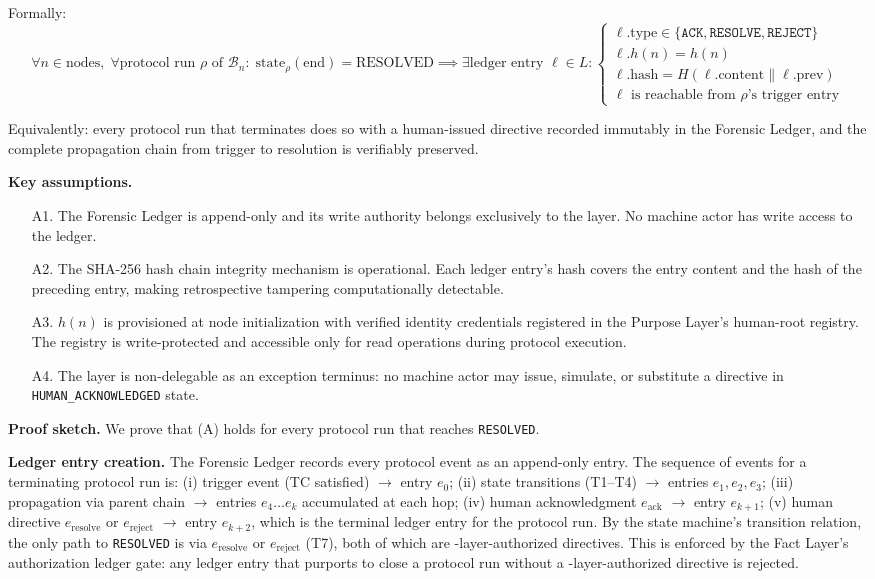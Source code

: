 Formally:
\[
\forall n \in \text{nodes},\; \forall \text{protocol run } \rho \text{ of } \mathcal{B}_n:\;
\text{state}_{\rho}(\text{end}) = \text{RESOLVED}
\implies
\exists \text{ledger entry } \ell \in L:
\begin{cases}
\ell.\text{type} \in \{\texttt{ACK}, \texttt{RESOLVE}, \texttt{REJECT}\} \\
\ell.h(n) = h(n) \\
\ell.\text{hash} = H(\ell.\text{content} \| \ell.\text{prev}) \\
\ell \text{ is reachable from } \rho\text{'s trigger entry}
\end{cases}
\tag{A}
\]

Equivalently: every protocol run that terminates does so with a human-issued directive recorded immutably in the Forensic Ledger, and the complete propagation chain from trigger to resolution is verifiably preserved.

\medskip\noindent\textbf{Key assumptions.}
\begin{itemize}\itemsep=0pt
\item[A1.] The Forensic Ledger is append-only and its write authority belongs exclusively to the \fact{} layer. No machine actor has write access to the ledger.
\item[A2.] The SHA-256 hash chain integrity mechanism is operational. Each ledger entry's hash covers the entry content and the hash of the preceding entry, making retrospective tampering computationally detectable.
\item[A3.] $h(n)$ is provisioned at node initialization with verified identity credentials registered in the Purpose Layer's human-root registry. The registry is write-protected and accessible only for read operations during protocol execution.
\item[A4.] The \purpose{} layer is non-delegable as an exception terminus: no machine actor may issue, simulate, or substitute a directive in \texttt{HUMAN\_ACKNOWLEDGED} state.
\end{itemize}

\medskip\noindent\textbf{Proof sketch.}
We prove that (A) holds for every protocol run that reaches \texttt{RESOLVED}.

\textbf{Ledger entry creation.} The Forensic Ledger records every protocol event as an append-only entry. The sequence of events for a terminating protocol run is: (i) trigger event (TC satisfied) $\to$ entry $e_0$; (ii) state transitions (T1--T4) $\to$ entries $e_1, e_2, e_3$; (iii) propagation via parent chain $\to$ entries $e_4 \dots e_k$ accumulated at each hop; (iv) human acknowledgment $e_{\text{ack}}$ $\to$ entry $e_{k+1}$; (v) human directive $e_{\text{resolve}}$ or $e_{\text{reject}}$ $\to$ entry $e_{k+2}$, which is the terminal ledger entry for the protocol run. By the state machine's transition relation, the only path to \texttt{RESOLVED} is via $e_{\text{resolve}}$ or $e_{\text{reject}}$ (T7), both of which are \purpose-layer-authorized directives. This is enforced by the Fact Layer's authorization ledger gate: any ledger entry that purports to close a protocol run without a \purpose-layer-authorized directive is rejected.

